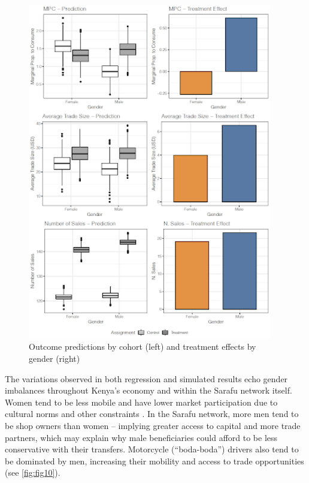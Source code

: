 \documentclass[12pt]{article}
\begin{document}
\begin{figure}[H]
    \centering
    \includegraphics[width=0.95\textwidth]{figures/fig_9}
    \caption{Outcome predictions by cohort (left) and treatment effects by gender (right)}
    \label{fig:fig9}
\end{figure}

The variations observed in both regression and simulated results echo gender imbalances throughout Kenya’s economy and within the Sarafu network itself. Women tend to be less mobile and have lower market participation due to cultural norms and other constraints \citep{bergman2019gendered}. In the Sarafu network, more men tend to be shop owners than women – implying greater access to capital and more trade partners, which may explain why male beneficiaries could afford to be less conservative with their transfers. Motorcycle (“boda-boda”) drivers also tend to be dominated by men, increasing their mobility and access to trade opportunities (see \autoref{fig:fig10}).
\end{document}
